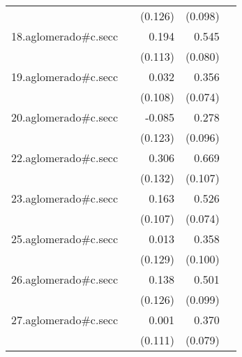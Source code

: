 {\begin{longtable}{l*{4}{D{.}{.}{-1}}}
            &                     &     (0.126)         &     (0.098)         &                     \\
\addlinespace
18.aglomerado#c.secc&                     &       0.194         &       0.545\sym{***}&                     \\
            &                     &     (0.113)         &     (0.080)         &                     \\
\addlinespace
19.aglomerado#c.secc&                     &       0.032         &       0.356\sym{***}&                     \\
            &                     &     (0.108)         &     (0.074)         &                     \\
\addlinespace
20.aglomerado#c.secc&                     &      -0.085         &       0.278\sym{**} &                     \\
            &                     &     (0.123)         &     (0.096)         &                     \\
\addlinespace
22.aglomerado#c.secc&                     &       0.306\sym{*}  &       0.669\sym{***}&                     \\
            &                     &     (0.132)         &     (0.107)         &                     \\
\addlinespace
23.aglomerado#c.secc&                     &       0.163         &       0.526\sym{***}&                     \\
            &                     &     (0.107)         &     (0.074)         &                     \\
\addlinespace
25.aglomerado#c.secc&                     &       0.013         &       0.358\sym{***}&                     \\
            &                     &     (0.129)         &     (0.100)         &                     \\
\addlinespace
26.aglomerado#c.secc&                     &       0.138         &       0.501\sym{***}&                     \\
            &                     &     (0.126)         &     (0.099)         &                     \\
\addlinespace
27.aglomerado#c.secc&                     &       0.001         &       0.370\sym{***}&                     \\
            &                     &     (0.111)         &     (0.079)         &                     \\

\end{longtable}}
